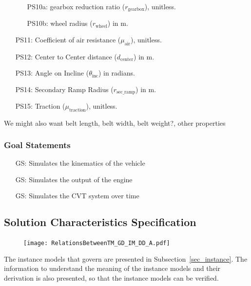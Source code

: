 \documentclass[12pt]{article}
\newcounter{goalnum} %
\begin{document}
\begin{itemize}
\begin{itemize}
  \item [PS10a:] gearbox reduction ratio ($r_{\text{gearbox}}$), unitless.
  \item [PS10b:] wheel radius ($r_{\text{wheel}}$) in m.
\end{itemize}

\item[PS11:] Coefficient of air resistance ($\mu_{\text{air}}$), unitless.

\item[PS12:] Center to Center distance ($d_{\text{center}}$) in m.

\item[PS13:] Angle on Incline ($\theta_{\text{inc}}$) in radians.

\item[PS14:] Secondary Ramp Radius ($r_{\text{sec\_ramp}}$) in m.

\item[PS15:] Traction ($\mu_{\text{traction}}$), unitless.

\end{itemize}
We might also want belt length, belt width, belt weight?, other properties

\subsubsection{Goal Statements}

\begin{itemize}

\item[GS\refstepcounter{goalnum}\thegoalnum \label{GS1}:]  Simulates the kinematics of the vehicle
\item[GS\refstepcounter{goalnum}\thegoalnum \label{GS2}:]  Simulates the output of the engine
\item[GS\refstepcounter{goalnum}\thegoalnum \label{GS3}:]  Simulates the CVT system over time

\end{itemize}

\subsection{Solution Characteristics Specification}
\begin{figure}[H]
  \texttt{[image: RelationsBetweenTM\_GD\_IM\_DD\_A.pdf]}
\end{figure}

The instance models that govern \progname{} are presented in
Subsection~\ref{sec_instance}.  The information to understand the meaning of the
instance models and their derivation is also presented, so that the instance
models can be verified.
\end{document}
